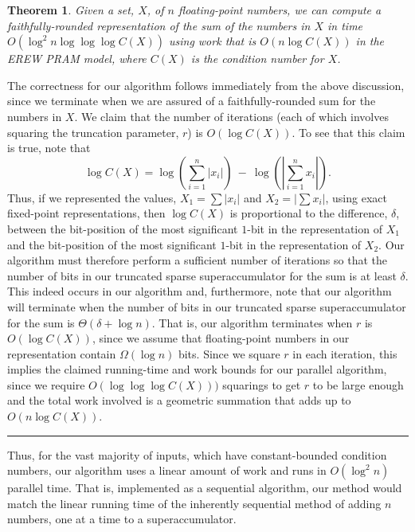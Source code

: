 \documentclass[11pt]{article}
\newtheorem{theorem}{Theorem}\newtheorem{lemma}[theorem]{Lemma}
\newenvironment{proof}{\noindent{\bf Proof:}}{\hspace*{\fill}\rule{6pt}{6pt}\bigskip}
\begin{document}
\begin{theorem}
\label{thm:super-complex}
Given a set, $X$, of $n$ floating-point numbers, we can compute a
faithfully-rounded representation of the sum of the numbers in $X$ in
time
$O(\log^2 n\log\log\log C(X))$ 
using work that is $O(n \log C(X))$ in the EREW PRAM model,
where $C(X)$ is the condition number for $X$.
\end{theorem}
\begin{proof}
The correctness for our algorithm follows immediately from
the above discussion, since we terminate when we are assured of a
faithfully-rounded sum for the numbers in $X$.
We claim that the number of iterations (each of which involves squaring the
truncation parameter, $r$) is $O(\log C(X))$.
To see that this claim is true, note that 
\[
\log C(X) = \log \left(\sum_{i=1}^n |x_i|\right)\ -\ 
            \log \left(\left|\sum_{i=1}^n x_i \right|\right).
\]
Thus, if we represented the values, 
$X_1=\sum |x_i|$ 
and $X_2=|\sum x_i|$, using exact 
fixed-point representations, then
$\log C(X)$ is proportional to
the difference, $\delta$, between the bit-position of the 
most significant $1$-bit in the representation of $X_1$
and the bit-position of the 
most significant $1$-bit in the representation of $X_2$.
Our algorithm must therefore perform a sufficient number of iterations
so that the number of bits in our truncated sparse superaccumulator
for the sum is at least $\delta$.
This indeed occurs in our algorithm and,
furthermore, note that our algorithm will terminate when the number of bits
in our truncated sparse superaccumulator for the sum is $\Theta(\delta+\log n)$.
That is, our algorithm
terminates when $r$ is $O(\log C(X))$, since we assume that 
floating-point numbers in our representation contain 
$\Omega(\log n)$ bits.
Since we square $r$ in each iteration, this implies the claimed 
running-time and work bounds for our parallel algorithm, since we require
$O(\log\log\log C(X)))$ squarings to get $r$ to be large enough and
the total work involved is a geometric summation that adds up to 
$O(n\log C(X))$.
\end{proof}

\ifFull
Thus, for the vast majority of inputs, which have 
constant-bounded condition numbers, our algorithm uses a linear amount of
work and runs in $O(\log^2 n)$ parallel time.
That is, implemented as a sequential algorithm, our method would match the
linear running time of the inherently sequential method of adding $n$
numbers, one at a time to a superaccumulator.
\fi
\end{document}
